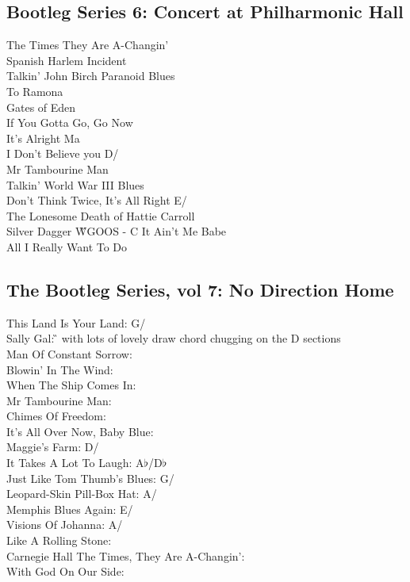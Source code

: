 \documentclass[a4paper,twoside]{memoir}
\begin{document}
\subsection{Bootleg Series 6: Concert at Philharmonic Hall}

The Times They Are A-Changin'  \G\\
Spanish Harlem Incident \G\\
Talkin' John Birch Paranoid Blues \G\\
To Ramona \D \\
Gates of Eden \G \\
If You Gotta Go, Go Now \G \\
It's Alright Ma \G \\
I Don't Believe you D/\G \\
Mr Tambourine Man \E \\
Talkin' World War III Blues \G \\
Don't Think Twice, It's All Right E/\A \\
The Lonesome Death of Hattie Carroll \E\\
Silver Dagger \G
WGOOS - C
It Ain't Me Babe \G \\
All I Really Want To Do \C


\subsection{The Bootleg Series, vol 7: No Direction Home}

This Land Is Your Land: G/\C \\
Sally Gal: \G {} with lots of lovely draw chord chugging on the D sections \\
Man Of Constant Sorrow: \G \\
Blowin' In The Wind: \D \\
When The Ship Comes In: \G \\
Mr Tambourine Man: \E \\
Chimes Of Freedom: \G \\
It's All Over Now, Baby Blue: \D \\
Maggie's Farm: D/\G \\
It Takes A Lot To Laugh: A$\flat$/D$\flat$ \\
Just Like Tom Thumb's Blues: G/\C \\
Leopard-Skin Pill-Box Hat: A/\D \\
Memphis Blues Again: E/\A \\
Visions Of Johanna: A/\D \\
Like A Rolling Stone: \C \\
Carnegie Hall The Times, They Are A-Changin': \G \\
With God On Our Side: \C
\end{document}

